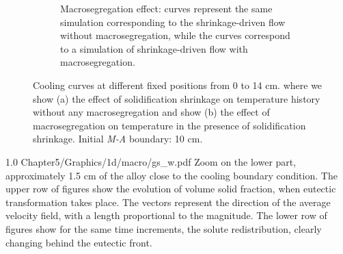 \begin{figure}[htbp]
\begin{subfigure}[t]{0.8\textwidth}
	\caption{Macrosegregation effect:  curves represent the same simulation corresponding to the shrinkage-driven flow without macrosegregation, while
	the  curves correspond to a simulation of shrinkage-driven flow with macrosegregation.}
    \label{fig:macro_effect}
  \end{subfigure}
\caption{Cooling curves at different fixed positions from 0 to 14 cm. 
where we show (a) the effect of solidification shrinkage on temperature history without any macrosegregation and
show (b) the effect of macrosegregation on temperature in the presence of solidification shrinkage.
Initial \emph{M-A} boundary: 10 cm.} 
\label{fig:1dalsi7_macro_shrinkage}
\end{figure}

\begin{figureth}
{1.0}
{Chapter5/Graphics/1d/macro/gs_w.pdf}
{Zoom on the lower part, approximately 1.5 cm of the alloy close to the cooling boundary condition. 
The upper row of figures show the evolution of volume solid fraction, when eutectic transformation takes place. 
The vectors represent the direction of the average velocity field, with a length proportional
to the magnitude. The lower row of figures show for the same time increments, the solute redistribution, 
clearly changing behind the eutectic front.}
\label{fig:1dalsi7_gs_w}
\end{figureth}

